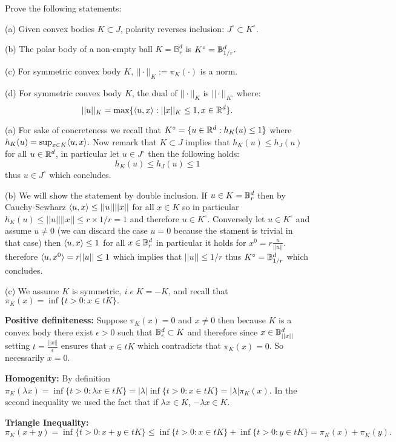 \begin{exercise}[]{}
Prove the following statements:

(a) Given convex bodies $K\subset J$, polarity reverses inclusion: $J^\circ \subset K^\circ$.

(b) The polar body of a non-empty ball $K = \mathbb{B}_r^d$ is $K^\circ = \mathbb{B}_{1/r}^d.$

(c) For symmetric convex body $K$, $||\cdot||_K := \pi_K(\cdot)$ is a norm.

(d) For symmetric convex body $K$, the dual of $||\cdot||_K$ is $||\cdot||_{K^\circ}$ where:
\[ ||u||_{K} =\max\{\langle u,x\rangle: ||x||_{K}\leq 1, x \in \mathbb{R}^d\}.\]
\end{exercise}
\begin{solution}[]
(a) For sake of concreteness we recall that $K^\circ = \{ u \in \mathbb{R}^d:h_K(u) \leq 1\}$ where $h_K(u) =  \sup_{x \in K}\langle u,x\rangle.$ 
Now remark that $K \subset J$ implies that $h_K(u) \leq h_J(u)$ for all $u \in \mathbb{R}^d$, in particular let $u \in J^\circ$ then the following holds:
\[h_K(u) \leq h_J(u) \leq 1\]
thus $u \in J^\circ$ which concludes.

(b) We will show the statement by double inclusion. If $u \in K=\mathbb{B}_{r}^d$ then by Cauchy-Scwharz $\langle u,x\rangle \leq ||u||||x||$ for all $x \in K$ so in particular
$h_{K}(u) \leq ||u||||x|| \leq r \times 1/r = 1$ and therefore $u \in K^{\circ}.$ 
Conversely let $u \in K^\circ$ and assume $u \neq 0$ (we can discard the case $u =0$ because the stament is trivial in that case)
then $  \langle u,x\rangle \leq 1$ for all $x \in \mathbb{B}_r^d$
 in particular it holds for $x^0 = r \frac{u}{||u||}$.
therefore $\langle u,x^0\rangle = r ||u|| \leq 1$ which implies that $||u|| \leq 1/r$ thus $K^\circ = \mathbb{B}_{1/r}^d$ which concludes.

(c) We assume $K$ is symmetric, \textit{i.e} $K = -K$, and recall that $\pi_K(x) = \inf \{t>0: x \in tK \}.$

\textbf{Positive definiteness:} Suppose $\pi_K(x)=0$ and $x \neq 0$ then because $K$ is a convex body there exist $\epsilon >0$ such that $\mathbb{B}_\epsilon^d \subset K$ and therefore since $x \in \mathbb{B}_{||x||}^d$ setting
$t =\frac{||x||}{\epsilon}$ ensures that $x \in tK$ which contradicts that $\pi_K(x) =0$. So necessarily $x =0$.

\textbf{Homogenity:} By definition $\pi_K(\lambda x) = \inf \{t>0: \lambda x \in tK \} = |\lambda| \inf \{t>0: x \in tK \}=|\lambda| \pi_K(x).$
In the second inequality we used the fact that if $\lambda x \in K$, $-\lambda x \in K$.

\textbf{Triangle Inequality:} $\pi_K(x+y) = \inf \{t>0: x+y \in tK \} \leq  \inf\{t>0: x \in tK \} + \inf \{t>0:  y \in tK \}=\pi_K(x)+\pi_K(y).$

\end{solution}
